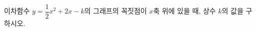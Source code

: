 \hspace*{2mm}\begin{minipage}[t]{\dimexpr\linewidth-2mm\relax}\vspace{0pt}
이차함수 $y=\dfrac{1}{2}x^2+2x-k$의 그래프의 꼭짓점이 $x$축 위에 있을 때, 상수 $k$의 값을 구하시오.\end{minipage}
